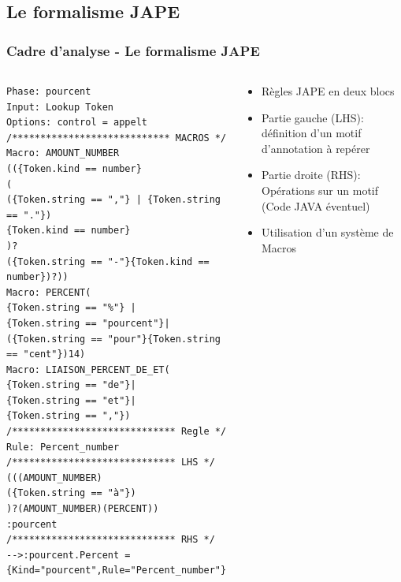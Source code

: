 \documentclass[10pt, compress]{beamer}
\begin{document}
\subsection{Le formalisme JAPE}
\begin{frame}[fragile]
\frametitle{Cadre d'analyse - Le formalisme JAPE}
\begin{columns}
	\begin{scriptsize}
\begin{lstlisting}
Phase: pourcent
Input: Lookup Token
Options: control = appelt
/**************************** MACROS */
Macro: AMOUNT_NUMBER
(({Token.kind == number}
(
({Token.string == ","} | {Token.string == "."})
{Token.kind == number}
)?
({Token.string == "-"}{Token.kind == number})?))
Macro: PERCENT(
{Token.string == "%"} |
{Token.string == "pourcent"}|
({Token.string == "pour"}{Token.string == "cent"})14)
Macro: LIAISON_PERCENT_DE_ET(
{Token.string == "de"}|
{Token.string == "et"}|
{Token.string == ","})
/***************************** Regle */
Rule: Percent_number
/***************************** LHS */
(((AMOUNT_NUMBER)
({Token.string == "à"})
)?(AMOUNT_NUMBER)(PERCENT))
:pourcent
/***************************** RHS */ 
-->:pourcent.Percent = 
{Kind="pourcent",Rule="Percent_number"}
\end{lstlisting}
\end{scriptsize}
	\begin{scriptsize}
	\begin{itemize}
	[square]
	
	\item{Règles JAPE en deux blocs}
	\item{Partie gauche (LHS): définition d'un motif d'annotation à repérer}
	\item{Partie droite (RHS): Opérations sur un motif (Code JAVA éventuel)}
	\item{Utilisation d'un système de Macros}
	\end{itemize}
	
	\end{scriptsize}
\end{columns}
\end{frame}
\end{document}
